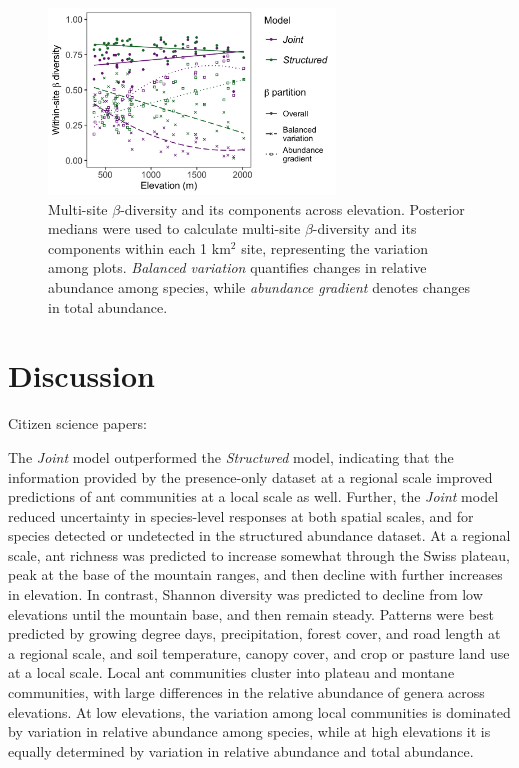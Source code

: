 \documentclass[preprint,review,times,12pt,3p]{elsarticle}
\begin{document}
\begin{figure}
\centering\includegraphics[width=3in]{ms/1_Ecography/1/figs/beta_diversity.png}
\caption{\label{fig:beta_div} Multi-site $\beta$-diversity and its components across elevation. Posterior medians were used to calculate multi-site $\beta$-diversity and its components within each 1 km$^2$ site, representing the variation among plots. \emph{Balanced variation} quantifies changes in relative abundance among species, while \emph{abundance gradient} denotes changes in total abundance.}
\end{figure}


 




\section{Discussion}
\label{S:4}
Citizen science papers: \citep{Altwegg2019, Pernat2020, Henckel2020, Duan2020, Johnston2020,Robinson2020, Beck2010, Poisson2020}

The \emph{Joint} model outperformed the \emph{Structured} model, indicating that the information provided by the presence-only dataset at a regional scale improved predictions of ant communities at a local scale as well. Further, the \emph{Joint} model reduced uncertainty in species-level responses at both spatial scales, and for species detected or undetected in the structured abundance dataset. At a regional scale, ant richness was predicted to increase somewhat through the Swiss plateau, peak at the base of the mountain ranges, and then decline with further increases in elevation. In contrast, Shannon diversity was predicted to decline from low elevations until the mountain base, and then remain steady. Patterns were best predicted by growing degree days, precipitation, forest cover, and road length at a regional scale, and soil temperature, canopy cover, and crop or pasture land use at a local scale. Local ant communities cluster into plateau and montane communities, with large differences in the relative abundance of genera across elevations. At low elevations, the variation among local communities is dominated by variation in relative abundance among species, while at high elevations it is equally determined by variation in relative abundance and total abundance.
\end{document}
